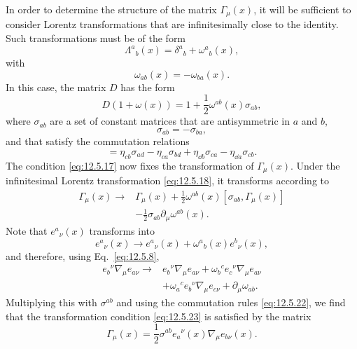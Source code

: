 In order to determine the structure of the matrix \(\Gamma_\mu(x)\), it will
be sufficient to consider Lorentz transformations that are infinitesimally
close to the identity. Such transformations must be of the form
\begin{equation}
  \Lambda^a{}_b(x)
  =
  \delta^a{}_b+\omega^a{}_b(x),
  \tag{12.5.18}\label{eq:12.5.18}
\end{equation}
with
\begin{equation}
  \omega_{ab}(x)=-\omega_{ba}(x).
  \tag{12.5.19}\label{eq:12.5.19}
\end{equation}
In this case, the matrix \(D\) has the form
\begin{equation}
  D(1+\omega(x))
  =
  1+\frac12\omega^{ab}(x)\sigma_{ab},
  \tag{12.5.20}\label{eq:12.5.20}
\end{equation}
where \(\sigma_{ab}\) are a set of constant matrices that are antisymmetric in
\(a\) and \(b\),
\begin{equation}
  \sigma_{ab}=-\sigma_{ba},
  \tag{12.5.21}\label{eq:12.5.21}
\end{equation}
and that satisfy the commutation relations
\begin{equation}
  [\sigma_{ab},\sigma_{cd}]
  =
  \eta_{cb}\sigma_{ad}
  -\eta_{ca}\sigma_{bd}
  +\eta_{\dd b}\sigma_{ca}
  -\eta_{\dd a}\sigma_{cb}.
  \tag{12.5.22}\label{eq:12.5.22}
\end{equation}
The condition \eqref{eq:12.5.17} now fixes the transformation of
\(\Gamma_\mu(x)\). Under the infinitesimal Lorentz transformation
\eqref{eq:12.5.18}, it transforms according to
\begin{equation}
\begin{aligned}
  \Gamma_\mu(x)\longrightarrow{}&
  \Gamma_\mu(x)
  +\frac12\omega^{ab}(x)[\sigma_{ab},\Gamma_\mu(x)]
  \\
  &-\frac12\sigma_{ab}\partial_\mu\omega^{ab}(x).
\end{aligned}
  \tag{12.5.23}\label{eq:12.5.23}
\end{equation}
Note that \(e^a{}_\nu(x)\) transforms into
\[
  e^a{}_\nu(x)
  \longrightarrow
  e^a{}_\nu(x)+\omega^a{}_b(x)e^b{}_\nu(x),
\]
and therefore, using Eq.~\eqref{eq:12.5.8},
\[
\begin{aligned}
  e_b{}^\nu\nabla_\mu e_{a\nu}
  \longrightarrow{}&
  e_b{}^\nu\nabla_\mu e_{a\nu}
  +\omega_b{}^c e_c{}^\nu\nabla_\mu e_{a\nu}
  \\
  &+\omega_a{}^c e_b{}^\nu\nabla_\mu e_{c\nu}
  +\partial_\mu\omega_{ab}.
\end{aligned}
\]
Multiplying this with \(\sigma^{ab}\) and using the commutation rules
\eqref{eq:12.5.22}, we find that the transformation condition
\eqref{eq:12.5.23} is satisfied by the matrix
\begin{equation}
  \Gamma_\mu(x)
  =
  \frac12\sigma^{ab}e_a{}^\nu(x)\nabla_\mu e_{b\nu}(x).
  \tag{12.5.24}\label{eq:12.5.24}
\end{equation}

